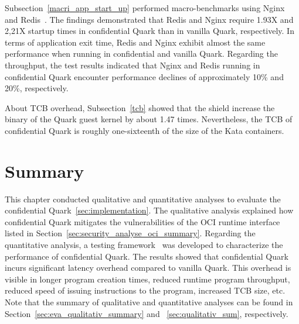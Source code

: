 Subsection~\ref*{macri_app_start_up} performed macro-benchmarks using Nginx~\cite*{nginx} and Redis~\cite*{redis}. The findings demonstrated that Redis and Nginx require 1.93X and 2,21X startup times in confidential Quark than in vanilla Quark, respectively. 
In terms of application exit time, Redis and Nginx exhibit almost the same performance when running in confidential and vanilla Quark. Regarding the throughput, the test results indicated that Nginx and Redis running in confidential Quark encounter performance declines of approximately 10\% and 20\%, 
respectively.

About TCB overhead, Subsection~\ref{tcb} showed that the shield increase the binary of the Quark guest kernel by about 1.47 times. Nevertheless, the TCB of confidential Quark is roughly one-sixteenth of the size of the Kata containers. 

\section{Summary}
This chapter conducted qualitative and quantitative analyses to evaluate the confidential Quark~\ref{sec:implementation}. The qualitative analysis explained how confidential Quark mitigates the vulnerabilities of the OCI runtime interface listed in Section~\ref*{sec:security_analyse_oci_summary}. 
Regarding the quantitative analysis, a testing framework~\cite*{benchamark_framework} was developed to characterize the performance of confidential Quark. The results showed that confidential Quark incurs significant latency overhead compared to vanilla Quark. 
This overhead is visible in longer program creation times, reduced runtime program throughput, reduced speed of issuing instructions to the program, increased \acrshort{TCB} size, etc. 
Note that the summary of qualitative and quantitative analyses can be found in Section~\ref*{sec:eva_qualitativ_summary} and ~\ref{sec:qualitativ_sum}, respectively. 
\cleardoublepage

